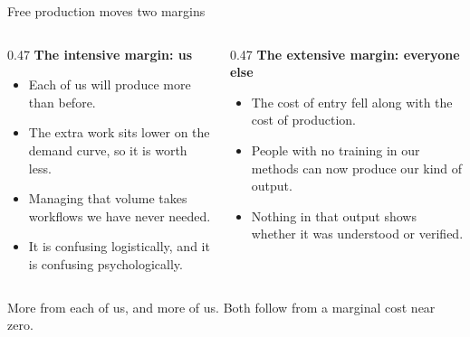 \documentclass[aspectratio=169,11pt]{beamer}
\begin{document}
\begin{frame}{Free production moves two margins}

\begin{columns}[T]
\begin{column}{0.47\textwidth}
\textbf{The intensive margin: us}
\begin{itemize}\setlength\itemsep{0.3em}
    \item Each of us will produce more than before.
    \item The extra work sits lower on the demand curve, so it is worth less.
    \item Managing that volume takes workflows we have never needed.
    \item It is confusing logistically, and it is confusing psychologically.
\end{itemize}
\end{column}
\begin{column}{0.47\textwidth}
\textbf{The extensive margin: everyone else}
\begin{itemize}\setlength\itemsep{0.3em}
    \item The cost of entry fell along with the cost of production.
    \item People with no training in our methods can now produce our kind of output.
    \item Nothing in that output shows whether it was understood or verified.
\end{itemize}
\end{column}
\end{columns}

\vspace{0.45cm}

\alert{More from each of us, and more of us. Both follow from a marginal cost near zero.}

\end{frame}
\end{document}
